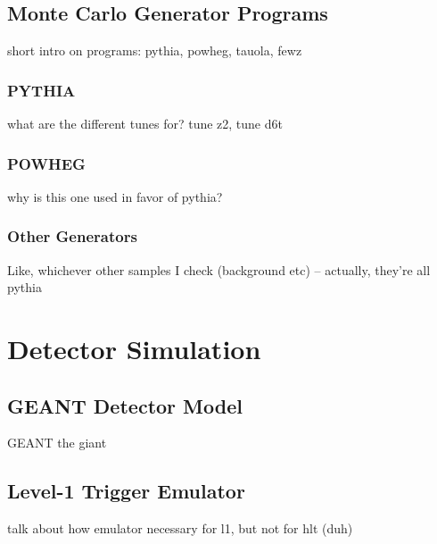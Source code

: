 \subsection{Monte Carlo Generator Programs}
\label{sim:MCGens}

short intro on programs: pythia, powheg, tauola, fewz

\subsubsection{PYTHIA}
\label{sim:MCGensPythia}
what are the different tunes for?  tune z2, tune d6t

\subsubsection{POWHEG}
\label{sim:MCGensPowheg}
why is this one used in favor of pythia?  

\subsubsection{Other Generators}
\label{sim:MCGensOther}
Like, whichever other samples I check (background etc) -- actually, they're all pythia



\section{Detector Simulation}
\label{sim:Detector}

\subsection{GEANT Detector Model}
\label{sim:DetectorGeant}

GEANT the giant

\subsection{Level-1 Trigger Emulator}
\label{sim:DetectorL1Emul}
talk about how emulator necessary for l1, but not for hlt (duh)
